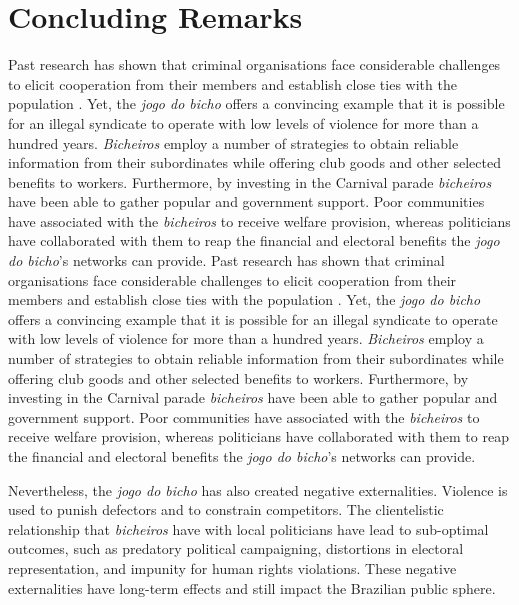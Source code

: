 \documentclass[a4paper,12pt]{article}
\begin{document}
\section{Concluding Remarks}
\label{sec:conclusion3}

Past research has shown that criminal organisations face considerable challenges to elicit cooperation from their members and establish close ties with the population \citep[e.g.][]{gambetta1996sicilian,skarbek2011governance,skarbek2012prison,varese2001russian,varese2011mafias}. Yet, the \textit{jogo do bicho} offers a convincing example that it is possible for an illegal syndicate to operate with low levels of violence for more than a hundred years. \textit{Bicheiros} employ a number of strategies to obtain reliable information from their subordinates while offering club goods and other selected benefits to workers. Furthermore, by investing in the Carnival parade \textit{bicheiros} have been able to gather popular and government support. Poor communities have associated with the \textit{bicheiros} to receive welfare provision, whereas politicians have collaborated with them to reap the financial and electoral benefits the \textit{jogo do bicho}'s networks can provide.
Past research has shown that criminal organisations face considerable challenges to elicit cooperation from their members and establish close ties with the population \citep[e.g.][]{gambetta1996sicilian,skarbek2011governance,skarbek2012prison,varese2001russian,varese2011mafias}. Yet, the \textit{jogo do bicho} offers a convincing example that it is possible for an illegal syndicate to operate with low levels of violence for more than a hundred years. \textit{Bicheiros} employ a number of strategies to obtain reliable information from their subordinates while offering club goods and other selected benefits to workers. Furthermore, by investing in the Carnival parade \textit{bicheiros} have been able to gather popular and government support. Poor communities have associated with the \textit{bicheiros} to receive welfare provision, whereas politicians have collaborated with them to reap the financial and electoral benefits the \textit{jogo do bicho}'s networks can provide.

Nevertheless, the \textit{jogo do bicho} has also created negative externalities. Violence is used to punish defectors and to constrain competitors. The clientelistic relationship that \textit{bicheiros} have with local politicians have lead to sub-optimal outcomes, such as predatory political campaigning, distortions in electoral representation, and impunity for human rights violations. These negative externalities have long-term effects and still impact the Brazilian public sphere.
\end{document}

